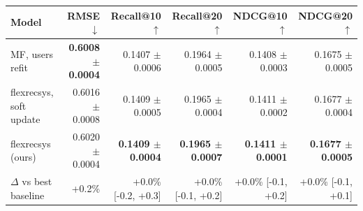 \begin{tabular}{lrrrrr}
\toprule
Model & RMSE $\downarrow$ & Recall@10 $\uparrow$ & Recall@20 $\uparrow$ & NDCG@10 $\uparrow$ & NDCG@20 $\uparrow$ \\
\midrule
MF, users refit & \textbf{0.6008 $\pm$ 0.0004} & 0.1407 $\pm$ 0.0006 & 0.1964 $\pm$ 0.0005 & 0.1408 $\pm$ 0.0003 & 0.1675 $\pm$ 0.0005 \\
flexrecsys, soft update & 0.6016 $\pm$ 0.0008 & 0.1409 $\pm$ 0.0005 & 0.1965 $\pm$ 0.0004 & 0.1411 $\pm$ 0.0002 & 0.1677 $\pm$ 0.0004 \\
flexrecsys (ours) & 0.6020 $\pm$ 0.0004 & \textbf{0.1409 $\pm$ 0.0004} & \textbf{0.1965 $\pm$ 0.0007} & \textbf{0.1411 $\pm$ 0.0001} & \textbf{0.1677 $\pm$ 0.0005} \\
\midrule
$\Delta$ vs best baseline & +0.2\% & +0.0\% [-0.2, +0.3] & +0.0\% [-0.1, +0.2] & +0.0\% [-0.1, +0.2] & +0.0\% [-0.1, +0.1] \\
\bottomrule
\end{tabular}
